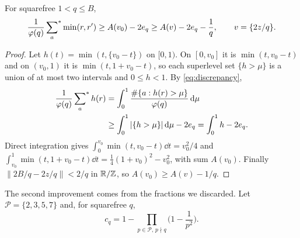\documentclass[11pt,colorlinks]{charlie}
\newcommand{\cP}{\mathcal P}
\begin{document}
\begin{lemma}\label{lem:mean}
For squarefree $1<q\le B$,
\[
 \frac1{\varphi(q)}\sideset{}{^*}\sum_a\min(r,r')\ge A(v_0)-2e_q\ge A(v)-2e_q-\frac1q,\qquad v=\{2z/q\}.
\]
\end{lemma}
\begin{proof}
Let $h(t)=\min(t,\{v_0-t\})$ on $[0,1)$. On $[0,v_0]$ it is $\min(t,v_0-t)$ and on $(v_0,1)$ it is $\min(t,1+v_0-t)$, so each superlevel set $\{h>\mu\}$ is a union of at most two intervals and $0\le h<1$. By \eqref{eq:discrepancy},
\begin{align*}
 \frac1{\varphi(q)}\sideset{}{^*}\sum_ah(r)&=\int_0^1\frac{\#\{a:h(r)>\mu\}}{\varphi(q)}\,\mathrm{d}\mu\\
 &\ge\int_0^1|\{h>\mu\}|\,\mathrm{d}\mu-2e_q=\int_0^1h-2e_q .
\end{align*}
Direct integration gives $\int_0^{v_0}\min(t,v_0-t)\dd t=v_0^2/4$ and $\int_{v_0}^1\min(t,1+v_0-t)\dd t=\frac14(1+v_0)^2-v_0^2$, with sum $A(v_0)$. Finally $\|2B/q-2z/q\|<2/q$ in $\mathbb{R}/\mathbb{Z}$, so $A(v_0)\ge A(v)-1/q$.
\end{proof}

The second improvement comes from the fractions we discarded. Let $\cP=\{2,3,5,7\}$ and, for squarefree $q$,
\[
 c_q=1-\prod_{p\in\cP,\,p\nmid q}\Big(1-\frac1{p^2}\Big).
\]
\end{document}
